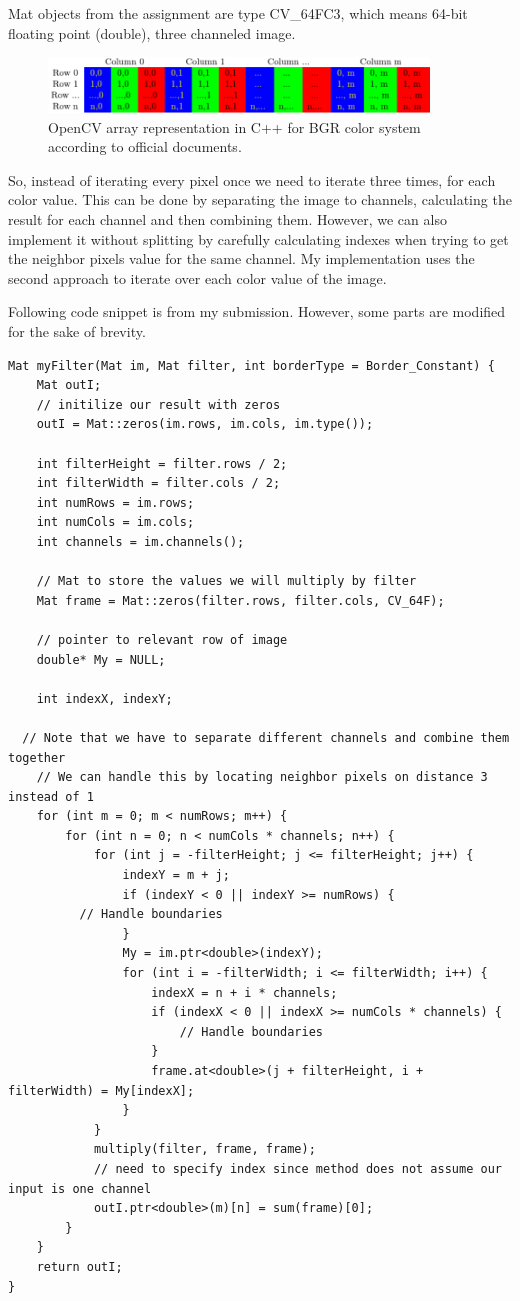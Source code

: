\documentclass{article}
\begin{document}
Mat objects from the assignment are type CV\_64FC3, which means 64-bit floating point (double), three channeled image.

\begin{figure}[!htb]
\centering
\includegraphics[width=0.9\textwidth]{multichannel.png}
\caption{OpenCV array representation in C++ for BGR color system according to official documents.}
\end{figure}

So, instead of iterating every pixel once we need to iterate three times, for each color value. This can be done by separating the image to channels, calculating the result for each channel and then combining them. However, we can also implement it without splitting by carefully calculating indexes when trying to get the neighbor pixels value for the same channel. My implementation uses the second approach to iterate over each color value of the image.

\newpage

Following code snippet is from my submission. However, some parts are modified for the sake of brevity.

\begin{lstlisting}[caption={My implementation of myFilter method.},captionpos=b]
Mat myFilter(Mat im, Mat filter, int borderType = Border_Constant) {
	Mat outI;
	// initilize our result with zeros
	outI = Mat::zeros(im.rows, im.cols, im.type());
	
	int filterHeight = filter.rows / 2;
	int filterWidth = filter.cols / 2;
	int numRows = im.rows;
	int numCols = im.cols;
	int channels = im.channels();

	// Mat to store the values we will multiply by filter
	Mat frame = Mat::zeros(filter.rows, filter.cols, CV_64F);

	// pointer to relevant row of image
	double* My = NULL;
	
	int indexX, indexY; 

  // Note that we have to separate different channels and combine them together
	// We can handle this by locating neighbor pixels on distance 3 instead of 1
	for (int m = 0; m < numRows; m++) {
		for (int n = 0; n < numCols * channels; n++) {
			for (int j = -filterHeight; j <= filterHeight; j++) {
				indexY = m + j;
				if (indexY < 0 || indexY >= numRows) {
          // Handle boundaries
				}
				My = im.ptr<double>(indexY);
				for (int i = -filterWidth; i <= filterWidth; i++) {
					indexX = n + i * channels;
					if (indexX < 0 || indexX >= numCols * channels) {
						// Handle boundaries
					}
					frame.at<double>(j + filterHeight, i + filterWidth) = My[indexX];
				}
			}
			multiply(filter, frame, frame);
			// need to specify index since method does not assume our input is one channel
			outI.ptr<double>(m)[n] = sum(frame)[0];
		}
	}
	return outI;
}
\end{lstlisting}
\end{document}
